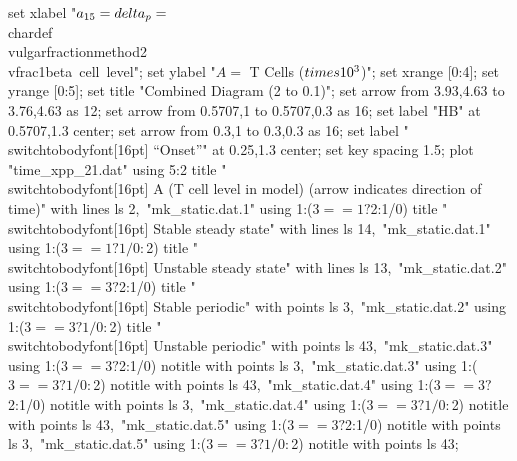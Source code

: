   set xlabel "$a_{15} = \\delta_p = $\\chardef\\vulgarfractionmethod2\\vfrac1{beta~cell~level}";
  set ylabel "$A = $ T Cells ($\\times 10^3$)";
  set xrange [0:4];
  set yrange [0:5];
  set title "Combined Diagram (2 to 0.1)";
  set arrow from 3.93,4.63 to 3.76,4.63 as 12;
  set arrow from 0.5707,1 to 0.5707,0.3 as 16;
  set label "HB" at 0.5707,1.3 center;
  set arrow from 0.3,1 to 0.3,0.3 as 16;
  set label "\\switchtobodyfont[16pt] “Onset”" at 0.25,1.3 center;
  set key spacing 1.5;
  plot "time_xpp_21.dat" using 5:2 title "\\switchtobodyfont[16pt] A (T cell level in model)  (arrow indicates direction of time)" with lines ls 2,\
       "mk_static.dat.1" using 1:($3==1?$2:1/0) title "\\switchtobodyfont[16pt] Stable steady state" with lines ls 14,\
       "mk_static.dat.1" using 1:($3==1?1/0:$2) title "\\switchtobodyfont[16pt] Unstable steady state" with lines ls 13,\
       "mk_static.dat.2" using 1:($3==3?$2:1/0) title "\\switchtobodyfont[16pt] Stable periodic" with points ls 3,\
       "mk_static.dat.2" using 1:($3==3?1/0:$2) title "\\switchtobodyfont[16pt] Unstable periodic" with points ls 43,\
       "mk_static.dat.3" using 1:($3==3?$2:1/0) notitle with points ls 3,\
       "mk_static.dat.3" using 1:($3==3?1/0:$2) notitle with points ls 43,\
       "mk_static.dat.4" using 1:($3==3?$2:1/0) notitle with points ls 3,\
       "mk_static.dat.4" using 1:($3==3?1/0:$2) notitle with points ls 43,\
       "mk_static.dat.5" using 1:($3==3?$2:1/0) notitle with points ls 3,\
       "mk_static.dat.5" using 1:($3==3?1/0:$2) notitle with points ls 43;
\stopGNUPLOTscript

